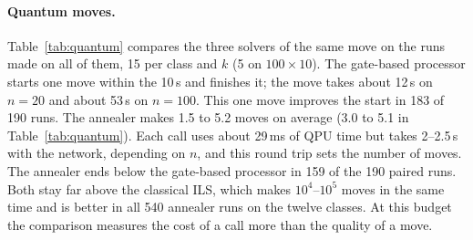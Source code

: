 \documentclass[letterpaper]{article} %
\theoremstyle{definition}
\begin{document}
\paragraph{Quantum moves.} Table~\ref{tab:quantum} compares the three
solvers of the same move on the runs made on all of them, 15 per class
and $k$ (5 on $100\times 10$). The gate-based processor starts one move within the 10\,s and finishes it; the move takes about 12\,s on $n=20$ and about 53\,s on $n=100$. This one move improves the start in 183 of 190 runs. The
annealer makes 1.5 to 5.2 moves on average (3.0 to 5.1 in Table~\ref{tab:quantum}). Each call uses about 29\,ms of
QPU time but takes 2--2.5\,s with the network, depending on $n$, and this round trip sets
the number of moves. The annealer ends below the gate-based processor
in 159 of the 190 paired runs. Both stay far
above the classical ILS, which makes $10^4$--$10^5$ moves in the same
time and is better in all 540 annealer runs on the twelve classes. At this budget the comparison measures the cost of a call more
than the quality of a move.
\end{document}
